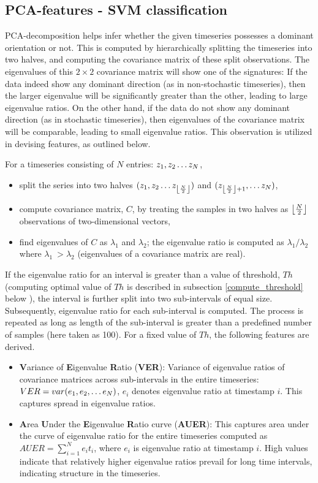 \documentclass[journal]{IEEEtran}
\DeclarePairedDelimiter\floor{\lfloor}{\rfloor}
\begin{document}
	\subsection{PCA-features - SVM classification}
	
	PCA-decomposition helps infer whether the given timeseries possesses a dominant orientation or not. This is computed by hierarchically splitting the timeseries into two halves, and computing the covariance matrix of these split observations. The eigenvalues of this $2 \times 2$ covariance matrix will show one of the signatures: If the data indeed show any dominant direction (as in non-stochastic timeseries), then the larger eigenvalue will be significantly greater than the other, leading to large eigenvalue ratios. On the other hand, if the data do not show any dominant direction (as in stochastic timeseries), then eigenvalues of the covariance matrix will be comparable, leading to small eigenvalue ratios. This observation is utilized in devising features, as outlined below.
	
	For a timeseries consisting of $N$ entries: $z_1, z_2 \mathellipsis z_N$,
	\begin{itemize}
		\item  split the series into two halves $(z_1, z_2 \mathellipsis z_{\floor*{\frac{N}{2}}})$ and $(z_{\floor*{\frac{N}{2}} + 1}, \mathellipsis z_N)$,
		\item compute covariance matrix, $C$,  by treating the samples in two halves as $\floor*{\frac{N}{2}}$ observations of two-dimensional vectors,
		\item find eigenvalues of $C$ as $\lambda_1$ and $\lambda_2$; the eigenvalue ratio is computed as  $\lambda_1/\lambda_2$ where $\lambda_1 \ > \lambda_2$ (eigenvalues of a covariance matrix are real).
	\end{itemize}
	If the eigenvalue ratio for an interval is greater than a value of threshold, $Th$ (computing optimal value of $Th$ is described in subsection \ref{compute_threshold} below ), the interval is further split into two sub-intervals of equal size.  Subsequently, eigenvalue ratio for each sub-interval is computed. The process is repeated as long as length of the sub-interval is greater than a predefined number of samples (here taken as 100).
	For a fixed value of $Th$, the following features are derived.
	\begin{itemize}
		\item \textbf{V}ariance of \textbf{E}igenvalue \textbf{R}atio (\textbf{VER}): Variance of eigenvalue ratios of covariance matrices across sub-intervals in the entire timeseries: $VER=var(e_1,e_2,\mathellipsis e_N)$, $e_i$ denotes eigenvalue ratio at timestamp  $i$. This captures spread in eigenvalue ratios.
		\item \textbf{A}rea \textbf{U}nder the \textbf{E}igenvalue \textbf{R}atio curve (\textbf{AUER}): This captures area under the curve of eigenvalue ratio for the entire timeseries computed as $AUER=\sum_{i=1}^{N} e_{i}t_{i}$, where $e_i$ is eigenvalue ratio at timestamp  $i$. High values indicate that relatively higher eigenvalue ratios prevail for long time intervals, indicating structure in the timeseries.
	\end{itemize}
	
\end{document}
